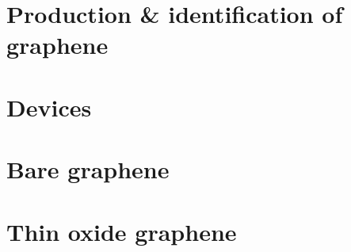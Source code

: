 \documentclass{report}
\begin{document}
	\chapter{Production \& identification of graphene}\label{chap:production&identification}
	
	
	\chapter{Devices}\label{chap:fab&characterisation}
	
	
	\chapter{Bare graphene}\label{chap:baregraphene}
	
	
	\chapter{Thin oxide graphene}\label{chap:thinoxidegraphene}
	
	


\end{document}

